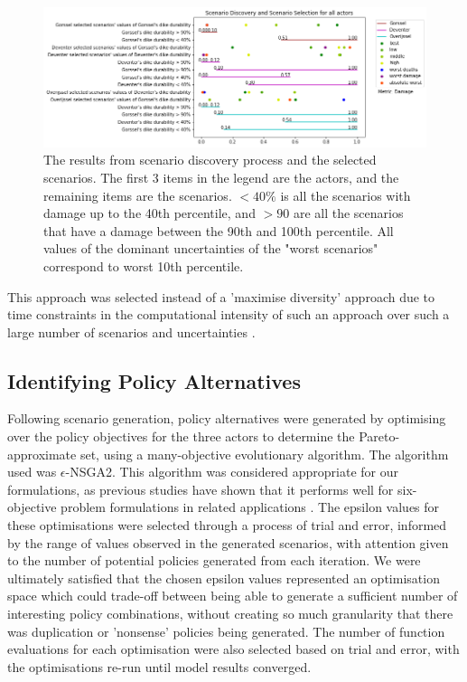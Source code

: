 \begin{figure}[h]
    \centering
    \includegraphics[width=\textwidth]{report/figures/results/scenario_discovery.png}
    \caption{The results from scenario discovery process and the selected scenarios. The first 3 items in the legend are the actors, and the remaining items are the scenarios. $<40\%$ is all the scenarios with damage up to the 40th percentile, and $>90$ are all the scenarios that have a damage between the 90th and 100th percentile. All values of the dominant uncertainties of the "worst scenarios" correspond to worst 10th percentile.}
    \label{fig:prim}
\end{figure}

This approach was selected instead of a 'maximise diversity' approach due to time constraints in the computational intensity of such an approach over such a large number of scenarios and uncertainties \parencite{eker_including_2018}.

\subsection{Identifying Policy Alternatives}

Following scenario generation, policy alternatives were generated by optimising over the policy objectives for the three actors to determine the Pareto-approximate set, using a many-objective evolutionary algorithm. The algorithm used was $\epsilon$-NSGA2. This algorithm was considered appropriate for our formulations, as previous studies have shown that it performs well for six-objective problem formulations in related applications \parencite{salazar_diagnostic_2016}. The epsilon values for these optimisations were selected through a process of trial and error, informed by the range of values observed in the generated scenarios, with attention given to the number of potential policies generated from each iteration. We were ultimately satisfied that the chosen epsilon values represented an optimisation space which could trade-off between being able to generate a sufficient number of interesting policy combinations, without creating so much granularity that there was duplication or 'nonsense' policies being generated. The number of function evaluations for each optimisation were also selected based on trial and error, with the optimisations re-run until model results converged.

